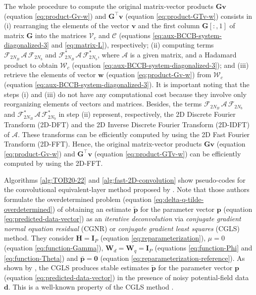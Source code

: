 The whole procedure to compute the original matrix-vector products $\mathbf{G}\mathbf{v}$ (equation \ref{eq:product-Gv-w})
and $\mathbf{G}^{\top}\mathbf{v}$ (equation \ref{eq:product-GTv-w}) consists in 
(i) rearranging the elements of the vector $\mathbf{v}$ and the first column $\mathbf{G}[:,1]$ of matrix $\mathbf{G}$
into the matrices $\boldsymbol{\mathcal{V}}_{c}$ and $\boldsymbol{\mathcal{C}}$ 
(equations \ref{eq:aux-BCCB-system-diagonalized-3} and \ref{eq:matrix-L}), respectively;
(ii) computing terms $\boldsymbol{\mathcal{F}}_{2N_{B}} \, \boldsymbol{\mathcal{A}} \, \boldsymbol{\mathcal{F}}_{2N_{b}}$
and $\boldsymbol{\mathcal{F}}_{2N_{B}}^{\ast} \, \boldsymbol{\mathcal{A}} \, \boldsymbol{\mathcal{F}}_{2N_{b}}^{\ast}$,
where $\boldsymbol{\mathcal{A}}$ is a given matrix, and a Hadamard product to obtain $\boldsymbol{\mathcal{W}}_{c}$ 
(equation \ref{eq:aux-BCCB-system-diagonalized-3}); and
(iii) retrieve the elements of vector $\mathbf{w}$ (equation \ref{eq:product-Gv-w}) from
$\boldsymbol{\mathcal{W}}_{c}$ (equation \ref{eq:aux-BCCB-system-diagonalized-3}).
It is important noting that the steps (i) and (iii) do not have any computational cost because they involve
only reorganizing elements of vectors and matrices.
Besides, the terms $\boldsymbol{\mathcal{F}}_{2N_{B}} \, \boldsymbol{\mathcal{A}} \, \boldsymbol{\mathcal{F}}_{2N_{b}}$
and $\boldsymbol{\mathcal{F}}_{2N_{B}}^{\ast} \, \boldsymbol{\mathcal{A}} \, \boldsymbol{\mathcal{F}}_{2N_{b}}^{\ast}$
in step (ii) represent, respectively, the 2D Discrete Fourier Transform (2D-DFT) and 
the 2D Inverse Discrete Fourier Transform (2D-IDFT) of $\boldsymbol{\mathcal{A}}$.
These transforms can be efficiently computed by using the 2D Fast Fourier Transform (2D-FFT).
Hence, the original matrix-vector products $\mathbf{G}\mathbf{v}$ (equation \ref{eq:product-Gv-w})
and $\mathbf{G}^{\top}\mathbf{v}$ (equation \ref{eq:product-GTv-w}) can be efficiently computed by using the 2D-FFT.

Algorithms \ref{alg:TOB20-22} and \ref{alg:fast-2D-convolution} show pseudo-codes for the convolutional equivalent-layer 
method proposed by \citet{takahashi-etal2020, takahashi-etal2022}.
Note that those authors formulate the overdetermined problem (equation \ref{eq:delta-q-tilde-overdetermined}) of obtaining 
an estimate $\tilde{\mathbf{p}}$ for the parameter vector $\mathbf{p}$ (equation \ref{eq:predicted-data-vector}) as an \textit{iterative deconvolution} via 
\textit{conjugate gradient normal equation residual} (CGNR) \citet[][sec. 11.3]{golub-vanloan2013} or \textit{conjugate gradient least squares} (CGLS) 
\cite[][p. 165]{aster_etal2019} method. 
They consider $\mathbf{H} = \mathbf{I}_{P}$ (equation \ref{eq:reparameterization}), 
$\mu = 0$ (equation \ref{eq:function-Gamma}), 
$\mathbf{W}_{d} = \mathbf{W}_{q} = \mathbf{I}_{P}$ (equations \ref{eq:function-Phi} and \ref{eq:function-Theta})
and $\bar{\mathbf{p}} = \mathbf{0}$ (equation \ref{eq:reparameterization-reference}).
As shown by \citet{takahashi-etal2020, takahashi-etal2022}, the CGLS produces stable estimates $\tilde{\mathbf{p}}$ for the
parameter vector $\mathbf{p}$ (equation \ref{eq:predicted-data-vector}) in the presence of 
noisy potential-field data $\mathbf{d}$. This is a well-known property of the CGLS method \citep[e.g.,][p. 166]{aster_etal2019}.

